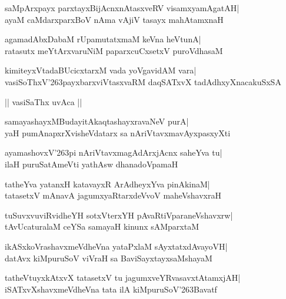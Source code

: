 \documentclass[twoside,12pt,openright]{book}
\def\S{\char'263}
\newcounter{shloka}[chapter]
\begin{document}
\begin{shloka}%
saMpArxpayx parxtayxBijAcnxnAtasxveRV visamxyamAgatAH|\\
ayaM caMdarxparxBoV nAma vAjiV tasayx mahAtamxnaH
\end{shloka}

\begin{shloka}%
agamadAbxDabaM rUpamutatxmaM keVna heVtunA|\\
ratasutx meYtArxvaruNiM paparxcuCxsetxV puroVdhasaM
\end{shloka}

\begin{shloka}%
kimiteyxVtadaBUcicxtarxM vada yoVgavidAM vara|\\
vasiSoThxV\S payxbarxviVtasxvaRM daqSATxvX tadAdhxyXnacakuSxSA
\end{shloka}


\begin{center}
|| vasiSaThx uvAca ||
\end{center}
\begin{shloka}%
samayashayxMBudayitAkaqtashayxravaNeV purA|\\
yaH pumAnapxrXvisheVdatarx sa nAriVtavxmavAyxpasxyXti
\end{shloka}

\begin{shloka}%
ayamashovxV\S pi nAriVtavxmagAdArxjAcnx saheYva tu|\\
ilaH puruSatAmeVti yathAsw dhanadoVpamaH
\end{shloka}

\begin{shloka}%
tatheYva yatanxH katavayxR ArAdheyxYva pinAkinaM|\\
tatasetxV mAnavA jagumxyaRtarxdeVvoV maheVshavxraH
\end{shloka}

\begin{shloka}%
tuSuvxvuviRvidheYH sotxVterxYH pAvaRtiVparaneVshavxrw|\\
tAvUcaturalaM ceYSa samayaH kinunx sAMparxtaM
\end{shloka}

\begin{shloka}%
ikASxkoVrashavxmeVdheVna yataPxlaM sAyxtatxdAvayoVH|\\
datAvx kiMpuruSoV viVraH sa BaviSayxtayxsaMshayaM
\end{shloka}

\begin{shloka}%
tatheVtuyxkAtxvX tatasetxV tu jagumxveYRvasavxtAtamxjAH|\\
iSATxvXshavxmeVdheVna tata ilA kiMpuruSoV\S Bavatf
\end{shloka}
\end{document}
